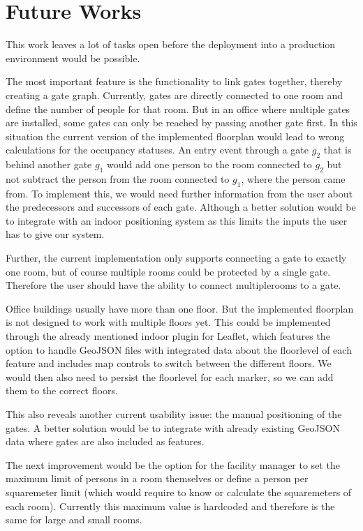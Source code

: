 \section{Future Works}

This work leaves a lot of tasks open before the deployment into a production environment would be possible.

The most important feature is the functionality to link gates together, thereby creating a gate graph. Currently, gates are directly connected to one room and define the number of people for that room. But in an office where multiple gates are installed, some gates can only be reached by passing another gate first. In this situation the current version of the implemented floorplan would lead to wrong calculations for the occupancy statuses. An entry event through a gate \(g_2\) that is behind another gate \(g_1\) would add one person to the room connected to \(g_2\) but not subtract the person from the room connected to \(g_1\), where the person came from. To implement this, we would need further information from the user about the predecessors and successors of each gate. Although a better solution would be to integrate with an indoor positioning system as this limits the inputs the user has to give our system.

Further, the current implementation only supports connecting a gate to exactly one room, but of course multiple rooms could be protected by a single gate. Therefore the user should have the ability to connect multiplerooms to a gate.

Office buildings usually have more than one floor. But the implemented floorplan is not designed to work with multiple floors yet. This could be implemented through the already mentioned indoor plugin for Leaflet, which features the option to handle GeoJSON files with integrated data about the floorlevel of each feature and includes map controls to switch between the different floors. We would then also need to persist the floorlevel for each marker, so we can add them to the correct floors.

This also reveals another current usability issue: the manual positioning of the gates. A better solution would be to integrate with already existing GeoJSON data where gates are also included as features.

The next improvement would be the option for the facility manager to set the maximum limit of persons in a room themselves or define a person per squaremeter limit (which would require to know or calculate the squaremeters of each room). Currently this maximum value is hardcoded and therefore is the same for large and small rooms.

